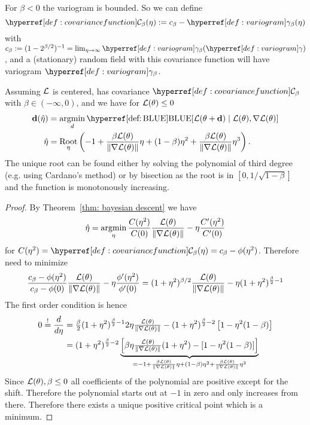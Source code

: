 For \(\beta<0\) the variogram is bounded. So we can define
\[
	\C_\beta(\lr) := c_\beta - \variogram_\beta(\lr)
\]
with \(c_\beta := (1-2^{\beta/2})^{-1} =
\lim_{\lr\to\infty}\variogram_\beta(\variogram)\), and a (stationary) random
field with this covariance function will have variogram \(\variogram_\beta\).

\begin{theorem}[Stationary]
	Assuming \(\mathcal{L}\) is centered, has covariance \(\C_\beta\) with
	\(\beta\in(-\infty, 0)\), and we have for \(\mathcal{L}(\theta)\le 0\)
	\begin{align*}
		\step(\hat{\lr})
		&= \argmin_{d}
		\BLUE[\Loss(\param + \step) \mid \Loss(\param), \grad\Loss(\param)]\\
		\hat{\lr}
		&= \Root_\lr\left(
			-1 + \frac{\beta\Loss(\param)}{\|\grad\Loss(\param)\|}\lr
			+(1-\beta)\lr^2 + \frac{\beta\Loss(\param)}{\|\grad\Loss(\param)\|}\lr^3
		\right).
	\end{align*}
	The unique root can be found either by solving the polynomial of third degree
	(e.g. using Cardano's method) or by bisection as the root is in \([0,
	1/\sqrt{1-\beta}]\) and the function is monotonously increasing.
\end{theorem}

\begin{proof}
	By Theorem~\ref{thm: bayesian descent}	we have
	\begin{equation*}
		\hat{\eta}	
		= \operatorname*{argmin}_{\eta}\frac{C(\eta^2)}{C(0)} \frac{\mathcal{L}(\theta)}{\|\nabla\mathcal{L}(\theta)\|}
		-  \eta\frac{C'(\eta^2)}{C'(0)}
	\end{equation*}
	for \(\sqC(\lr^2) = \C_\beta(\lr) = c_\beta - \phi(\lr^2)\). Therefore need
	to minimize
	\begin{equation*}
		\frac{c_\beta - \phi(\eta^2)}{c_\beta - \phi(0)}
		\frac{\mathcal{L}(\theta)}{\|\nabla\mathcal{L}(\theta)\|}
		- \eta\frac{\phi'(\eta^2)}{\phi'(0)}
		= (1+\eta^2)^{\beta/2} 
		\frac{\mathcal{L}(\theta)}{\|\nabla\mathcal{L}(\theta)\|}
		- \eta(1+\eta^2)^{\frac\beta2-1}\\
	\end{equation*}
	The first order condition is hence
	\begin{align*}
		0\overset!=\frac{d}{d\eta}
		&= \tfrac\beta2(1+\eta^2)^{\frac\beta2-1}2\eta 
		\tfrac{\mathcal{L}(\theta)}{\|\nabla\mathcal{L}(\theta)\|}
		- (1+\eta^2)^{\frac\beta2 -2} \left[1 - \eta^2(1-\beta)\right]\\
		&= (1+\eta^2)^{\frac\beta2-2}\underbrace{\left[
			\beta\eta\tfrac{\mathcal{L}(\theta)}{\|\nabla\mathcal{L}(\theta)\|}(1+\eta^2)
			- [1-\eta^2(1-\beta)]
		\right]}_{
			= -1 + \frac{\beta\mathcal{L}(\theta)}{\|\nabla\mathcal{L}(\theta)\|}\eta
			+(1-\beta)\eta^2 + \frac{\beta\mathcal{L}(\theta)}{\|\nabla\mathcal{L}(\theta)\|}\eta^3
		}
	\end{align*}
	Since \(\mathcal{L}(\theta), \beta\le0\) all coefficients of the polynomial
	are positive except for the shift. Therefore the polynomial starts out
	at \(-1\) in zero and only increases from there. Therefore there exists
	a unique positive critical point which is a minimum.
\end{proof}
